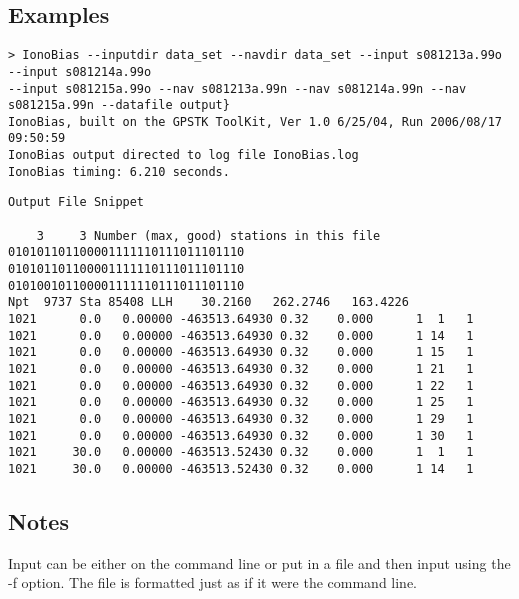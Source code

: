 \subsection{Examples}
\begin{\outputsize}
\begin{lstlisting}
> IonoBias --inputdir data_set --navdir data_set --input s081213a.99o --input s081214a.99o
--input s081215a.99o --nav s081213a.99n --nav s081214a.99n --nav s081215a.99n --datafile output}
IonoBias, built on the GPSTK ToolKit, Ver 1.0 6/25/04, Run 2006/08/17 09:50:59
IonoBias output directed to log file IonoBias.log
IonoBias timing: 6.210 seconds.
\end{lstlisting}

\begin{verbatim}
Output File Snippet

    3     3 Number (max, good) stations in this file
010101101100001111110111011101110
010101101100001111110111011101110
010100101100001111110111011101110
Npt  9737 Sta 85408 LLH    30.2160   262.2746   163.4226
1021      0.0   0.00000 -463513.64930 0.32    0.000      1  1   1
1021      0.0   0.00000 -463513.64930 0.32    0.000      1 14   1
1021      0.0   0.00000 -463513.64930 0.32    0.000      1 15   1
1021      0.0   0.00000 -463513.64930 0.32    0.000      1 21   1
1021      0.0   0.00000 -463513.64930 0.32    0.000      1 22   1
1021      0.0   0.00000 -463513.64930 0.32    0.000      1 25   1
1021      0.0   0.00000 -463513.64930 0.32    0.000      1 29   1
1021      0.0   0.00000 -463513.64930 0.32    0.000      1 30   1
1021     30.0   0.00000 -463513.52430 0.32    0.000      1  1   1
1021     30.0   0.00000 -463513.52430 0.32    0.000      1 14   1

\end{verbatim}

\end{\outputsize}

\subsection{Notes}
Input can be either on the command line or put in a file and then input using the -f option. The file is formatted just as if
it were the command line.

%

